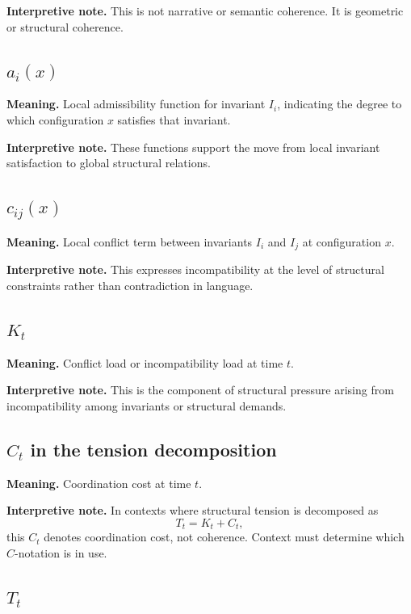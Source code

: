 \documentclass[11pt,a4paper]{article}
\begin{document}
	\textbf{Interpretive note.} This is not narrative or semantic coherence. It is geometric or structural coherence.
	
	\subsection{$a_i(x)$}
	
	\textbf{Meaning.} Local admissibility function for invariant $I_i$, indicating the degree to which configuration $x$ satisfies that invariant.
	
	\textbf{Interpretive note.} These functions support the move from local invariant satisfaction to global structural relations.
	
	\subsection{$c_{ij}(x)$}
	
	\textbf{Meaning.} Local conflict term between invariants $I_i$ and $I_j$ at configuration $x$.
	
	\textbf{Interpretive note.} This expresses incompatibility at the level of structural constraints rather than contradiction in language.
	
	\subsection{$K_t$}
	
	\textbf{Meaning.} Conflict load or incompatibility load at time $t$.
	
	\textbf{Interpretive note.} This is the component of structural pressure arising from incompatibility among invariants or structural demands.
	
	\subsection{$C_t$ in the tension decomposition}
	
	\textbf{Meaning.} Coordination cost at time $t$.
	
	\textbf{Interpretive note.} In contexts where structural tension is decomposed as
	\[
	T_t = K_t + C_t,
	\]
	this $C_t$ denotes coordination cost, not coherence. Context must determine which $C$-notation is in use.
	
	\subsection{$T_t$}
	
\end{document}
